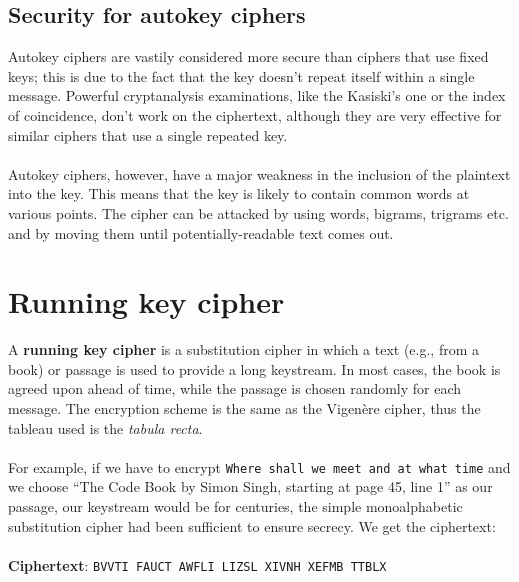 \documentclass[Lau,binding=0.6cm,oneside]{sapthesis}
\begin{document}
\subsection{Security for autokey ciphers}
Autokey ciphers are vastily considered more secure than ciphers that use fixed keys; this is due to the fact that the key doesn't repeat itself within a single message. Powerful cryptanalysis examinations, like the Kasiski's one or the index of coincidence, don't work on the ciphertext\supercite{autokey}, although they are very effective for similar ciphers that use a single repeated key.\\\\
Autokey ciphers, however, have a major weakness in the inclusion of the plaintext into the key. This means that the key is likely to contain common words at various points. The cipher can be attacked by using words, bigrams, trigrams etc. and by moving them until potentially-readable text comes out.\\
\section{Running key cipher}
A \textbf{running key cipher} is a substitution cipher in which a text (e.g., from a book) or passage is used to provide a long keystream. In most cases, the book is agreed upon ahead of time, while the passage is chosen randomly for each message. The encryption scheme is the same as the Vigenère cipher, thus the tableau used is the \textit{tabula recta}.\\\\
For example, if we have to encrypt \colorbox{gray!12}{\small{\texttt{Where shall we meet and at what time}}} and we choose “The Code Book by Simon Singh, starting at page 45, line 1” as our passage, our keystream would be \textsf{for centuries, the simple monoalphabetic substitution cipher had been sufficient to ensure secrecy}. We get the ciphertext:\\\\
\textbf{Ciphertext}: \colorbox{gray!12}{\small{\texttt{BVVTI FAUCT AWFLI LIZSL XIVNH XEFMB TTBLX}}}\\\
\end{document}
